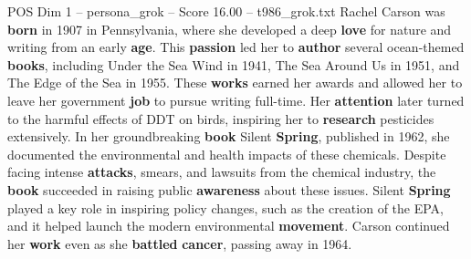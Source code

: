 \begin{textsample}{POS Dim 1 – persona\_grok – Score 16.00 – t986\_grok.txt}  \label{ex:f1_pos_037}
Rachel Carson was \textbf{born} in 1907 in Pennsylvania, where she developed a deep \textbf{love} for nature and writing from an early \textbf{age}.
This \textbf{passion} led her to \textbf{author} several ocean-themed \textbf{books}, including Under the Sea Wind in 1941, The Sea Around Us in 1951, and The Edge of the Sea in 1955.
These \textbf{works} earned her awards and allowed her to leave her government \textbf{job} to pursue writing full-time.
Her \textbf{attention} later turned to the harmful effects of DDT on birds, inspiring her to \textbf{research} pesticides extensively.
In her groundbreaking \textbf{book} Silent \textbf{Spring}, published in 1962, she documented the environmental and health impacts of these chemicals.
Despite facing intense \textbf{attacks}, smears, and lawsuits from the chemical industry, the \textbf{book} succeeded in raising public \textbf{awareness} about these issues.
Silent \textbf{Spring} played a key role in inspiring policy changes, such as the creation of the EPA, and it helped launch the modern environmental \textbf{movement}.
Carson continued her \textbf{work} even as she \textbf{battled} \textbf{cancer}, passing away in 1964.

\end{textsample}
